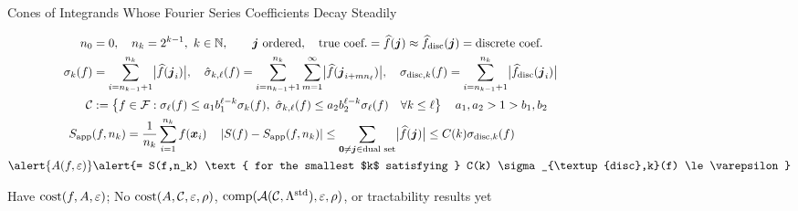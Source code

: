 \documentclass[11pt,compress,xcolor={usenames,dvipsnames},aspectratio=169]{beamer}
\newcommand{\Sapp}{S_{\textup{app}}}
\newcommand{\LambdaStd}{\Lambda^{\textup{std}}}
\begin{document}
\begin{frame}{Cones of Integrands Whose Fourier Series Coefficients Decay Steadily}

\vspace{-8ex}

\begin{align*}
n_0 & = 0, \quad n_k = 2^{k-1}, \ k \in \naturals, \qquad \vj \text{ ordered}, \quad \text{true coef.} = \hf(\vj) \approx \hf_{\text{disc}}(\vj) = \text{discrete coef.}\\
	 \sigma_k(f) & = \sum_{i=n_{k-1}+1}^{n_k}  \bigabs{\hf(\vj_i)}, \quad  \hsigma_{k,\ell}(f)  = \sum_{i=n_{k-1}+1}^{n_k} \sum_{m=1}^{\infty} \bigabs{\hf(\vj_{i+mn_{\ell}})}, \quad \sigma_{\textup{disc},k}(f) = \sum_{i=n_{k-1}+1}^{n_k}  \bigabs{\hf_{\text{disc}}(\vj_i)} \\
	 \cc &: = \left\{f \in \cf :  
	 \sigma_\ell(f) \le a_1 b_1^{\ell - k}\sigma_k(f), \   \hsigma_{k,\ell}(f) \le a_2 b_2^{\ell - k} \sigma_\ell(f) \quad \forall k \le \ell \right\} \quad a_1, a_2 > 1 > b_1, b_2\\
      \MoveEqLeft{\Sapp(f,n_k) = \frac 1{n_k} \sum_{i=1}^{n_k} f(\vx_i)  \quad
    \abs{S(f) - \Sapp(f,n_k)} \le \sum_{\vzero \ne \vj \in \text{dual set}} \bigabs{\hf(\vj)} \le C(k) \sigma_{\textup{disc},k}(f)} \\
    \alert{A(f,\varepsilon)} & \alert{= S(f,n_k) \text{ for the smallest $k$ satisfying } C(k) \sigma_{\textup{disc},k}(f) \le \varepsilon}
\end{align*}

\vspace{-4ex}
\alert{Have} $\operatorname{cost}(f,A,\varepsilon)$; \quad \alert{No} $\operatorname{cost}(A,\mathcal{C},\varepsilon,\rho)$,  $\comp(\ca(\cc,\LambdaStd),\varepsilon,\rho)$, or  tractability results \alert{yet}

\end{frame}
\end{document}
